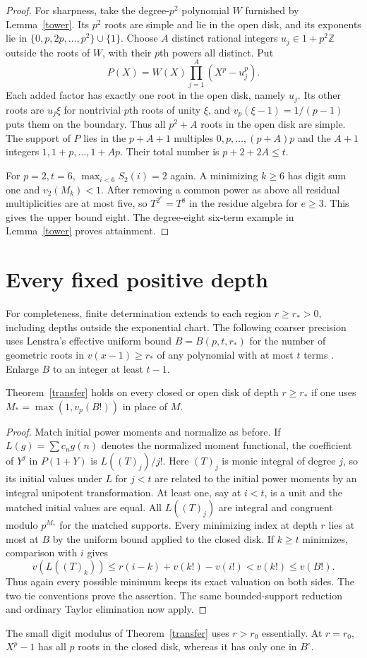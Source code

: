 \documentclass[11pt]{article}
\begin{document}
\begin{proof}
For sharpness, take the degree-$p^2$ polynomial $W$ furnished by
Lemma~\ref{tower}. Its $p^2$ roots are simple and lie in the open disk, and its
exponents lie in $\{0,p,2p,\ldots,p^2\}\cup\{1\}$. Choose $A$ distinct rational
integers $u_j\in1+p^2\mathbb Z$ outside the roots of $W$, with their $p$th
powers all distinct. Put
\[
 P(X)=W(X)\prod_{j=1}^{A}(X^p-u_j^p).
\]
Each added factor has exactly one root in the open disk, namely $u_j$.
Its other roots are $u_j\xi$ for nontrivial $p$th roots of unity $\xi$,
and $v_p(\xi-1)=1/(p-1)$ puts them on the boundary.
Thus all $p^2+A$ roots in the open disk are simple. The support of $P$
lies in the $p+A+1$ multiples $0,p,\ldots,(p+A)p$ and the $A+1$ integers
$1,1+p,\ldots,1+Ap$. Their total number is $p+2+2A\le t$.

For $p=2,t=6$, $\max_{i<6}S_2(i)=2$ again. A minimizing $k\ge6$ has digit sum one
and $v_2(M_k)<1$. After removing a common power as above all residual
multiplicities are at most five, so $T^{2^e}=T^8$ in the residue algebra for
$e\ge3$. This gives the upper bound eight. The degree-eight six-term example in
Lemma~\ref{tower} proves attainment.
\end{proof}

\section{Every fixed positive depth}
For completeness, finite determination extends to each region $r\ge r_*>0$, including depths outside the exponential chart. The following coarser precision uses Lenstra's effective uniform bound $B=B(p,t,r_*)$ for the number of geometric roots in $v(x-1)\ge r_*$ of any polynomial with at most $t$ terms \cite[Theorem 3.2 and Proposition 6.1]{len}. Enlarge $B$ to an integer at least $t-1$.

\begin{proposition}
Theorem~\ref{transfer} holds on every closed or open disk of depth $r\ge r_*$ if one uses $M_*=\max(1,v_p(B!))$ in place of $M$.
\end{proposition}
\begin{proof}
Match initial power moments and normalize as before. If $L(g)=\sum c_n g(n)$ denotes the normalized moment functional, the coefficient of $Y^j$ in $P(1+Y)$ is $L((T)_j)/j!$. Here $(T)_j$ is monic integral of degree $j$, so its initial values under $L$ for $j<t$ are related to the initial power moments by an integral unipotent transformation. At least one, say at $i<t$, is a unit and the matched initial values are equal. All $L((T)_j)$ are integral and congruent modulo $p^{M_*}$ for the matched supports. Every minimizing index at depth $r$ lies at most at $B$ by the uniform bound applied to the closed disk. If $k\ge t$ minimizes, comparison with $i$ gives
\[
 v(L((T)_k))\le r(i-k)+v(k!)-v(i!)<v(k!)\le v(B!).
\]
Thus again every possible minimum keeps its exact valuation on both sides. The two tie conventions prove the assertion. The same bounded-support reduction and ordinary Taylor elimination now apply.
\end{proof}
The small digit modulus of Theorem~\ref{transfer} uses $r>r_0$ essentially. At $r=r_0$, $X^p-1$ has all $p$ roots in the closed disk, whereas it has only one in $B^\circ$.
\end{document}
